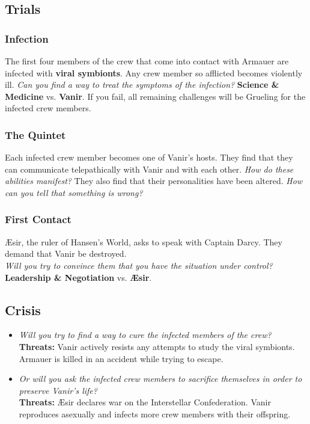 \documentclass[11pt, a5paper, parskip=half-, DIV=12]{scrartcl}
\begin{document}
\newpage

\subsection*{Trials}
\subsubsection*{Infection}
The first four members of the crew that come into contact with Armauer are infected with \textbf{viral symbionts}. Any crew member so afflicted becomes violently ill. \textit{Can you find a way to treat the symptoms of the infection?} \textbf{Science \& Medicine} vs. \textbf{Vanir}. If you fail, all remaining challenges will be Grueling for the infected crew members.

\subsubsection*{The Quintet}
Each infected crew member becomes one of Vanir's hosts. They find that they can communicate telepathically with Vanir and with each other. \textit{How do these abilities manifest?} They also find that their personalities have been altered. \textit{How can you tell that something is wrong?}

\subsubsection*{First Contact}
\AE{}sir, the ruler of Hansen's World, asks to speak with Captain Darcy. They demand that Vanir be destroyed. \\ \textit{Will you try to convince them that you have the situation under control?} \textbf{Leadership \& Negotiation} vs. \textbf{\AE{}sir}.

\subsection*{Crisis}

\begin{itemize}
	\item \textit{Will you try to find a way to cure the infected members of the crew?} \textbf{Threats:} Vanir actively resists any attempts to study the viral symbionts.  Armauer is killed in an accident while trying to escape.
	\item \textit{Or will you ask the infected crew members to sacrifice themselves in order to preserve Vanir's life?} \\ \textbf{Threats:} \AE{}sir declares war on the Interstellar Confederation. Vanir reproduces asexually and infects more crew members with their offspring.
\end{itemize}
\end{document}
